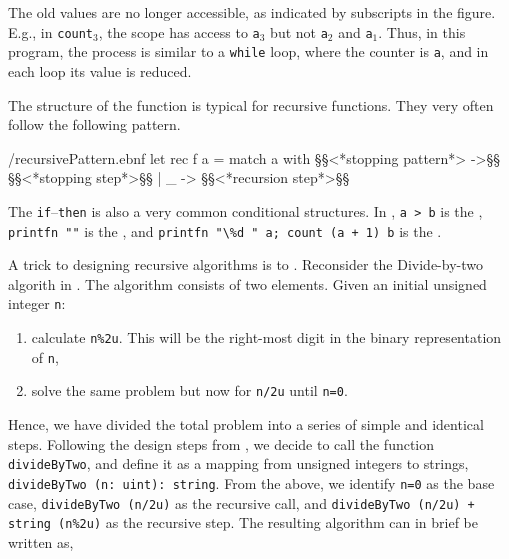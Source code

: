 \documentclass[fsharpNotes.tex]{subfiles}
\begin{document}
The old values are no longer accessible, as indicated by subscripts in the figure. E.g., in \lstinline{count}$_3$, the scope has access to \lstinline{a}$_3$ but not \lstinline{a}$_2$ and \lstinline{a}$_1$. Thus, in this program, the process is similar to a \lstinline{while} loop, where the counter is \lstinline{a}, and in each loop its value is reduced.

The structure of the function is typical for recursive functions. They very often follow the following pattern.
\begin{verbatimwrite}{\ebnf/recursivePattern.ebnf}
let rec f a =
  match a with
    §§<*stopping pattern*> ->§§
      §§<*stopping step*>§§
    | _ ->
      §§<*recursion step*>§§
\end{verbatimwrite}
%
The \lstinline{if}--\lstinline{then} is also a very common conditional structures. In , \lstinline{a > b} is the , \lstinline{printfn ""} is the , and \lstinline{printfn "\%d " a; count (a + 1) b} is the .

A trick to designing recursive algorithms is to . Reconsider the Divide-by-two algorith in . The algorithm consists of two elements. Given an initial unsigned integer \lstinline{n}:
\begin{enumerate}
\item calculate \lstinline{n%2u}. This will be the right-most digit in the binary representation of \lstinline{n},
\item solve the same problem but now for \lstinline{n/2u} until \lstinline{n=0}.
\end{enumerate}
Hence, we have divided the total problem into a series of simple and identical steps. Following the design steps from , we decide to call the function \lstinline{divideByTwo}, and define it as a mapping from unsigned integers to strings, \lstinline{divideByTwo (n: uint): string}. From the above, we identify \lstinline{n=0} as the base case, \lstinline{divideByTwo (n/2u)} as the recursive call, and \lstinline{divideByTwo (n/2u) + string (n%2u)} as the recursive step. The resulting algorithm can in brief be written as, 
%
%
\end{document}
